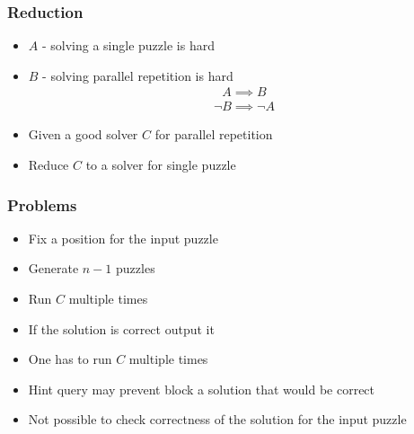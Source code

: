 \documentclass[first, handout,notes]{ETHclass}
\begin{document}
\begin{frame}[t]
\frametitle{Reduction}
\begin{itemize}
  \item $A$ - solving a single puzzle is hard
  \item $B$ - solving parallel repetition is hard
    \begin{align*}
      A \implies B
    \end{align*}
      \begin{align*}
        \lnot B \implies \lnot A
      \end{align*}
  \item Given a good solver $C$ for parallel repetition
  \item Reduce $C$ to a solver for single puzzle
\end{itemize}
\end{frame}

\begin{frame}[t]
\frametitle{Problems}
\begin{itemize}
  \item Fix a position for the input puzzle
  \item Generate $n-1$ puzzles
  \item Run $C$ multiple times
  \item If the solution is correct output it
  \item One has to run $C$ multiple times
  \item Hint query may prevent block a solution that would be correct
  \item Not possible to check correctness of the solution for the input puzzle
\end{itemize}
\end{frame}
\end{document}
